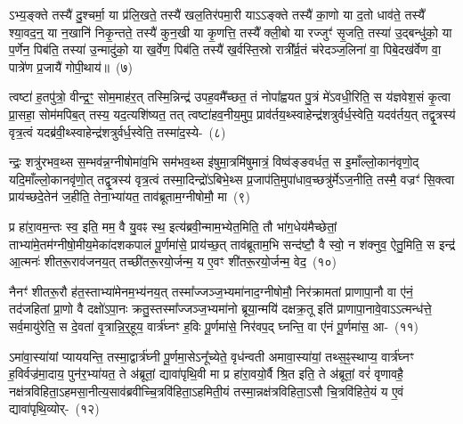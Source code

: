 ऽभ्य॒ङ्क्ते तस्यै॑ दु॒श्चर्मा॒ या प्र॑लि॒खते॒ तस्यै॑ खल॒तिर॑पमा॒री या\-ऽऽ\-ङ्क्ते तस्यै॑ का॒णो या द॒तो धाव॑ते॒ तस्यै᳚ श्या॒वद॒न्॒ या न॒खानि॑ निकृ॒न्तते॒ तस्यै॑ कुन॒खी या कृ॒णत्ति॒ तस्यै᳚ क्ली॒बो या रज्जुꣳ॑ सृ॒जति॒ तस्या॑ उ॒द्बन्धु॑को॒ या प॒र्णेन॒ पिब॑ति॒ तस्या॑ उ॒न्मादु॑को॒ या ख॒र्वेण॒ पिब॑ति॒ तस्यै॑ ख॒र्वस्ति॒स्रो रात्री᳚र्व्र॒तं च॑रेदञ्ज॒लिना॑ वा॒ पिबे॒दख॑र्वेण वा॒ पात्रे॑ण प्र॒जायै॑ गोपी॒थाय॑॥~(७)\ip

{\anuvakamend[{यथ्सो॑म॒पान॑न्ते वृ॒क्णात् तस्य॒ नाश्यं॑ वदेत॒ मारु॑को॒ या\-ऽख॑र्वेण वा॒ त्रीणि॑ च}]}

त्वष्टा॑ ह॒तपु॑त्रो॒ वीन्द्र॒ꣳ॒ सोम॒माह॑र॒त् तस्मि॒न्निन्द्र॑ उपह॒वमै᳚च्छत॒ तं नोपा᳚ह्वयत पु॒त्रं मे॑\-ऽवधी॒रिति॒ स य॑ज्ञवेश॒सं कृ॒त्वा प्रा॒सहा॒ सोम॑मपिब॒त् तस्य॒ यद॒त्यशि॑ष्यत॒ तत् त्वष्टा॑हव॒नीय॒मुप॒ प्राव॑र्तय॒थ्\-स्वाहेन्द्र॑शत्रुर्वर्ध॒स्वेति॒ यदव॑र्तय॒त् तद्वृ॒त्रस्य॑ वृत्र॒त्वं यदब्र॑वी॒थ्\-स्वाहेन्द्र॑शत्रुर्वर्ध॒स्वेति॒ तस्मा॑द॒स्ये-~(८)\ip

न्द्रः॒ शत्रु॑रभव॒थ्स स॒म्भव॑न्न॒ग्नी\-षोमा॑व॒भि सम॑भव॒थ्स इ॑षुमा॒त्रमि॑षुमात्रं॒ विष्व॑ङ्ङवर्धत॒ स इ॒माँल्लो॒कान॑वृणो॒द् यदि॒माँल्लो॒का\-नवृ॑णो॒त् तद्वृ॒त्रस्य॑ वृत्र॒त्वं तस्मा॒दिन्द्रो॑\-ऽबिभे॒थ्स प्र॒जा\-प॑ति॒मुपा॑\-धाव॒च्छत्रु॑र्मे\-ऽज॒नीति॒ तस्मै॒ वज्रꣳ॑ सि॒क्त्वा प्राय॑च्छदे॒तेन॑ ज॒हीति॒ तेना॒भ्या॑यत॒ ताव॑ब्रूताम॒ग्नी\-षोमौ॒ मा~(९)\ip

प्र हा॑रा॒वम॒न्तः स्व॒ इति॒ मम॒ वै यु॒वꣴ स्थ॒ इत्य॑ब्रवी॒न्माम॒भ्ये\-त॒मिति॒ तौ भा॑ग॒धेय॑मैच्छेतां॒ ताभ्या॑मे॒त\-म॑ग्नीषो॒मीय॒\-मेका॑\-दश\-कपालं पू॒र्णमा॑से॒ प्राय॑च्छ॒त् ताव॑ब्रूताम॒भि सन्द॑ष्टौ॒ वै स्वो॒ न श॑क्नुव॒ ऐतु॒मिति॒ स इन्द्र॑ आ॒त्मनः॑ शीतरू॒राव॑जनय॒त् तच्छी॑तरू॒रयो॒र्जन्म॒ य ए॒वꣳ शी॑तरू॒रयो॒र्जन्म॒ वेद॒~(१०)\ip


नैनꣳ॑ शीतरू॒रौ ह॑त॒स्ताभ्या॑मेनम॒भ्य॑नय॒त् तस्मा᳚ज्जञ्ज॒भ्यमा॑\-नाद॒ग्नी\-षोमौ॒ निर॑क्रामतां प्राणापा॒नौ वा ए॑नं॒ तद॑जहितां प्रा॒णो वै दक्षो॑\-ऽपा॒नः क्रतु॒स्तस्मा᳚ज्जञ्ज॒भ्यमा॑नो ब्रूया॒न्मयि॑ दक्षक्र॒तू इति॑ प्राणापा॒नावे॒वा\-ऽऽ\-त्मन्ध॑त्ते॒ सर्व॒मायु॑रेति॒ स दे॒वता॑ वृ॒त्रान्नि॒र्॒\mbox{}हूय॒ वार्त्र॑घ्नꣳ ह॒विः पू॒र्णमा॑से॒ निर॑वप॒द् घ्नन्ति॒ वा ए॑नं पू॒र्णमा॑स॒ आ-~(११)\ip

ऽमा॑वा॒स्या॑यां प्याययन्ति॒ तस्मा॒द्वार्त्र॑घ्नी पू॒र्णमा॒से\-ऽनू᳚च्येते॒ वृध॑न्वती अमावा॒स्या॑यां॒ तथ्स॒ꣴ॒स्थाप्य॒ वार्त्र॑घ्नꣳ ह॒विर्वज्र॑मा॒दाय॒ पुन॑र॒भ्या॑यत॒ ते अ॑ब्रूतां॒ द्यावा॑\-पृथि॒वी मा प्र हा॑रा॒वयो॒र्वै श्रि॒त इति॒ ते अ॑ब्रूतां॒ वरं॑ वृणावहै॒ नक्ष॑त्रविहिता॒\-ऽहमसा॒नीत्य॒साव॑ब्रवीच्चि॒त्रवि॑हिता॒\-ऽहमिती॒यं तस्मा॒न्नक्ष॑त्रविहिता॒\-ऽसौ चि॒त्रवि॑हिते॒यं य ए॒वं द्यावा॑पृथि॒व्योर्-~(१२)\ip

